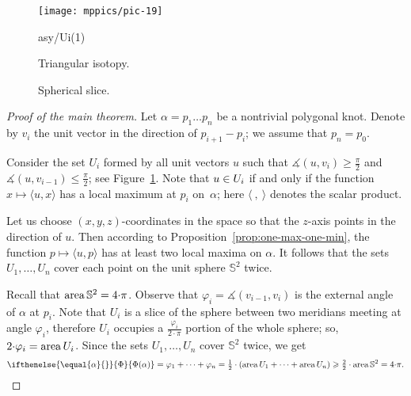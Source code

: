 \documentclass{article}
\newcommand*{\arXiv}[2]{#1} %
\newcommand*{\z}[1]{#1\nobreak\discretionary{}%
            {\hbox{$\mathsurround=0pt #1$}}{}}
\theoremstyle{theorem}
\newtheorem{Crofton-type formula}[theorem]{Crofton-type formula}
\newtheorem{Douglas--Rado theorem}[theorem]{\arXiv{Douglas--Rado theorem}{Theorem}}
\newtheorem{Extended monotonicity theorem}[theorem]{\arXiv{Extended monotonicity theorem}{Theorem}}
\theoremstyle{definition}
\def\area{\mathop{\rm area}\nolimits}
\newcommand*{\tc}[1]{\ifthenelse{\equal{#1}{}}{\Phi}{\Phi({#1})}}%
\def\phi{\varphi}
\def\ge{\geqslant}
\def\le{\leqslant}
\begin{document}
\begin{figure}[!ht]
\begin{minipage}{.48\textwidth}
\centering
\arXiv{\texttt{[image: mppics/pic-19]}}{\texttt{[image: pic-19]}}
\end{minipage}\hfill
\begin{minipage}{.48\textwidth}
\centering
\arXiv{\begin{lpic}[t(-0mm),b(0mm),r(4mm),l(0mm)]{asy/Ui(1)}}{\begin{lpic}[t(-0mm),b(0mm),r(4mm),l(0mm)]{Ui(1)}}
\lbl[tl]{18,10.5;$\phi_i$}
\end{lpic}
\end{minipage}

\medskip

\begin{minipage}{.48\textwidth}
\centering
\caption{Triangular isotopy.}
\label{fig2}
\end{minipage}\hfill
\begin{minipage}{.48\textwidth}
\centering
\caption{Spherical slice.}
\label{fig3}
\end{minipage}
\vskip-0mm
\end{figure}

\begin{proof}[Proof of \arXiv{the main theorem}{Main Theorem}]
Let $\alpha=p_1\dots p_n$ be a nontrivial polygonal knot.
Denote by $v_i$ the unit vector in the direction of $p_{i+1}-p_i$;
we assume that $p_n=p_0$.

Consider the set $U_i$ formed by all unit vectors $u$ such that $\measuredangle(u,v_i)\ge \tfrac \pi 2$ and $\measuredangle(u,v_{i-1})\le \tfrac \pi 2$;
see Figure~\ref{fig3}.
Note that $u\z\in U_i$ if and only if the function $x\mapsto \langle u,x\rangle$ has a local maximum at $p_i$ on~$\alpha$; here $\langle\ ,\ \rangle$ denotes the scalar product.

Let us choose $(x,y,z)$-coordinates in the space so that the $z$-axis points in the direction of $u$.
Then according to Proposition~\ref{prop:one-max-one-min}, the function $p\mapsto \langle u,p\rangle$ has at least two local maxima on $\alpha$.
It follows that the sets $U_1,\dots,U_n$ cover each point on the unit sphere $\mathbb{S}^2$ twice.

Recall that $\area \mathbb{S}^2=4\arXiv{{\cdot}}{}\pi$.
Observe that $\phi_i=\measuredangle(v_{i-1},v_i)$ is the external angle of $\alpha$ at $p_i$.
Note that $U_i$ is a slice of the sphere between two meridians meeting at angle $\phi_i$, therefore $U_i$ occupies a $\tfrac{\phi_i}{2\arXiv{{\cdot}}{}\pi}$ portion of the whole sphere; so, $2\arXiv{{\cdot}}{} \phi_i=\area U_i$.
Since the sets $U_1, \dots, U_n$ cover $\mathbb{S}^2$ twice, we get
\[\tc\alpha=\phi_1+\dots+\phi_n=\tfrac12\arXiv{\cdot}{} (\area U_1+\dots+\area U_n)\ge \tfrac22\arXiv{\cdot}{} \area\mathbb{S}^2=4\arXiv{{\cdot}}{}\pi.\]
\end{proof}
\end{document}
